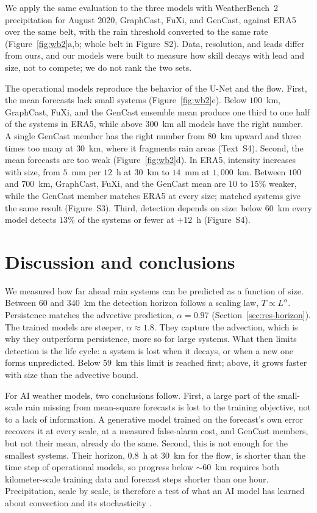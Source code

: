 \documentclass[draft]{agujournal2019}
\begin{document}
We apply the same evaluation to the three models with WeatherBench~2
precipitation for August 2020, GraphCast, FuXi, and GenCast, against ERA5 over the same belt, with the rain threshold
converted to the same rate (Figure~\ref{fig:wb2}a,b; whole belt in
Figure~S2). Data, resolution,
and leads differ from ours, and our models were built to measure how skill
decays with lead and size, not to compete; we do not rank the two sets.

The operational models reproduce the behavior of the U-Net and the flow.
First, the mean forecasts lack small systems (Figure~\ref{fig:wb2}c).
Below $100$~km, GraphCast, FuXi, and the GenCast ensemble mean produce one
third to one half of the systems in ERA5, while above $300$~km all models
have the right number. A single GenCast member has the right number from
$80$~km upward and three times too many at $30$~km, where it fragments
rain areas (Text~S4). Second, the mean forecasts are too weak
(Figure~\ref{fig:wb2}d). In ERA5, intensity increases with size, from
$5$~mm per $12$~h at $30$~km to $14$~mm at $1{,}000$~km. Between $100$ and
$700$~km, GraphCast, FuXi, and the GenCast mean are $10$ to $15\%$ weaker,
while the GenCast member matches ERA5 at every size; matched systems give
the same result (Figure~S3). Third, detection depends on size: below
$60$~km every model detects $13\%$ of the systems or fewer at $+12$~h (Figure~S4).



\section{Discussion and conclusions}\label{sec:discussion}

We measured how far ahead rain systems can be predicted as a function of
size. Between $60$ and $340$~km the detection
horizon follows a scaling law, $T \propto L^{\alpha}$. Persistence matches
the advective prediction, $\alpha = 0.97$ (Section~\ref{sec:res-horizon}). The trained models are steeper, $\alpha \approx 1.8$. They capture
the advection, which is why they outperform persistence, more so for large
systems. What then limits detection is the life cycle: a system is lost
when it decays, or when a new one forms unpredicted. Below $59$~km this
limit is reached first; above, it grows faster with size than the
advective bound.

For AI weather models, two conclusions follow. First, a large part of the
small-scale rain missing from mean-square forecasts is lost to the
training objective, not to a lack of information. A generative model
trained on the forecast's own error recovers it at every scale, at a
measured false-alarm cost, and GenCast members,
but not their mean, already do the same. Second, this is not enough for
the smallest systems. Their horizon, $0.8$~h at $30$~km for the flow, is
shorter than the time step of operational models, so progress below
${\sim}60$~km requires both kilometer-scale training data and forecast
steps shorter than one hour. Precipitation, scale by scale, is therefore a
test of what an AI model has learned about convection and its
stochasticity \cite{shamekh2023}.
\end{document}
